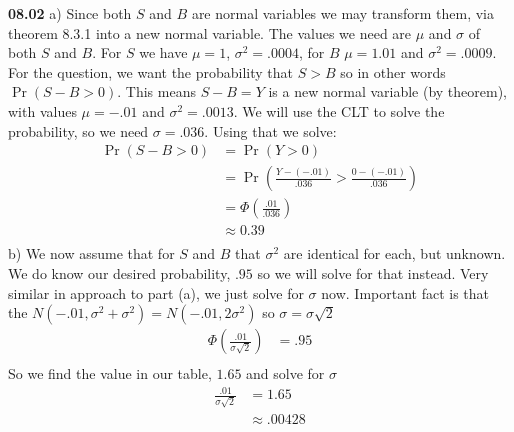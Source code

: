 {\bf 08.02} a) Since both $S$ and $B$ are normal variables we may transform them, via theorem 8.3.1 into
a new normal variable. The values we need are $\mu$ and $\sigma$ of both $S$ and $B$. For $S$ we have $\mu = 1$, 
$\sigma^2 = .0004$, for $B$ $\mu = 1.01$ and $\sigma^2 = .0009$. For the question, we want the probability that $S > B$
so in other words $\Pr ( S - B > 0)$. This means $S - B = Y$ is a new normal variable (by theorem), with values $\mu = -.01$
and $\sigma^2 = .0013$. We will use the CLT to solve the probability, so we need $\sigma = .036$. Using that we
solve: \\
\begin{align*}
	\Pr \left( S - B > 0 \right) & = \Pr \left( Y > 0 \right) \\
	& = \Pr \left( \frac{Y - (-.01)}{.036} > \frac{0 - (-.01)}{.036} \right) \\
	& = \Phi \left( \frac{.01}{.036} \right) \\
	& \approx 0.39  \\
\end{align*}
b) We now assume that for $S$ and $B$ that $\sigma^2$ are identical for each, but unknown. We do know our desired
probability, $.95$ so we will solve for that instead. Very similar in approach to part (a), we just solve for
$\sigma$ now. Important fact is that the $N(-.01, \sigma^2 + \sigma^2) = N(-.01, 2\sigma^2)$ so $\sigma = \sigma\sqrt{2}$ \\
\begin{align*}
	\Phi \left( \frac{.01}{\sigma\sqrt{2}} \right) &= .95 \\
\end{align*} 
So we find the value in our table, $1.65$ and solve for $\sigma$ \\
\begin{align*}
	\frac{.01}{\sigma\sqrt{2}}  &= 1.65 \\
	& \approx .00428 
\end{align*}
